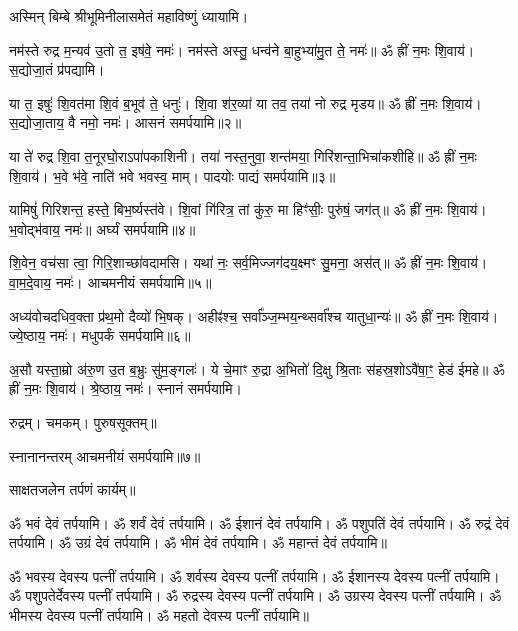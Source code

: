 अस्मिन् बिम्बे श्रीभूमिनीलासमेतं महाविष्णुं ध्यायामि। 



नम॑स्ते रुद्र म॒न्यव॑ उ॒तो त॒ इष॑वे॒ नमः॑। नम॑स्ते अस्तु॒ धन्व॑ने बा॒हुभ्या॑मु॒त ते॒ नमः॑॥ ॐ ह्रीं न॒मः शि॒वाय॑। स॒द्योजा॒तं प्र॑पद्यामि।

या त॒ इषुः॑ शि॒वत॑मा शि॒वं ब॒भूव॑ ते॒ धनुः॑। शि॒वा श॑र॒व्या॑ या तव॒ तया॑ नो रुद्र मृडय॥ ॐ ह्रीं न॒मः शि॒वाय॑। स॒द्योजा॒ताय॒ वै नमो॒ नमः॑। आसनं समर्पयामि॥२॥

या ते॑ रुद्र शि॒वा त॒नूरघो॒राऽपा॑पकाशिनी। तया॑ नस्त॒नुवा॒ शन्त॑मया॒ गिरि॑शन्ता॒\-भिचा॑कशीहि॥ ॐ ह्रीं न॒मः शि॒वाय॑। भ॒वे भ॑वे॒ नाति॑ भवे भवस्व॒ माम्। पादयोः पाद्यं समर्पयामि॥३॥

यामिषुं॑ गिरिशन्त॒ हस्ते॒ बिभ॒र्ष्यस्त॑वे। शि॒वां गि॑रित्र॒ तां कु॑रु॒ मा हिꣳ॑सीः॒ पुरु॑षं॒ जग॑त्॥ ॐ ह्रीं न॒मः शि॒वाय॑। भ॒वोद्भ॑वाय॒ नमः॑॥ अर्घ्यं समर्पयामि॥४॥

शि॒वेन॒ वच॑सा त्वा॒ गिरि॒शाच्छा॑वदामसि। यथा॑ नः॒ सर्व॒मिज्जग॑दय॒क्ष्मꣳ सु॒मना॒ अस॑त्॥ ॐ ह्रीं न॒मः शि॒वाय॑। वा॒म॒दे॒वाय॒ नमः॑। आचमनीयं समर्पयामि॥५॥

अध्य॑वोचदधिव॒क्ता प्र॑थ॒मो दैव्यो॑ भि॒षक्। अहीꣴ॑श्च॒ सर्वा᳚ञ्ज॒म्भय॒न्थ्सर्वा᳚श्च यातुधा॒न्यः॑॥ ॐ ह्रीं न॒मः शि॒वाय॑। ज्ये॒ष्ठाय॒ नमः॑। मधुपर्कं समर्पयामि॥६॥

अ॒सौ यस्ता॒म्रो अ॑रु॒ण उ॒त ब॒भ्रुः सु॑म॒ङ्गलः॑। ये चे॒माꣳ रु॒द्रा अ॒भितो॑ दि॒क्षु श्रि॒ताः स॑हस्र॒शोऽवै॑षा॒ꣳ॒ हेड॑ ईमहे॥ ॐ ह्रीं न॒मः शि॒वाय॑। श्रे॒ष्ठाय॒ नमः॑। स्नानं समर्पयामि। 


रुद्रम्। चमकम्। पुरुषसूक्तम्॥


स्नानानन्तरम् आचमनीयं समर्पयामि॥७॥

साक्षतजलेन तर्पणं कार्यम्॥

ॐ भवं देवं तर्पयामि। ॐ शर्वं देवं तर्पयामि। ॐ ईशानं देवं तर्पयामि। ॐ पशुपतिं देवं तर्पयामि। ॐ रुद्रं देवं तर्पयामि। ॐ उग्रं देवं तर्पयामि। ॐ भीमं देवं तर्पयामि। ॐ महान्तं देवं तर्पयामि॥

ॐ भवस्य देवस्य पत्नीं तर्पयामि। ॐ शर्वस्य देवस्य पत्नीं तर्पयामि। ॐ ईशानस्य देवस्य पत्नीं तर्पयामि। ॐ पशुपतेर्देवस्य पत्नीं तर्पयामि। ॐ रुद्रस्य देवस्य पत्नीं तर्पयामि। ॐ उग्रस्य देवस्य पत्नीं तर्पयामि। ॐ भीमस्य देवस्य पत्नीं तर्पयामि। ॐ महतो देवस्य पत्नीं तर्पयामि॥


